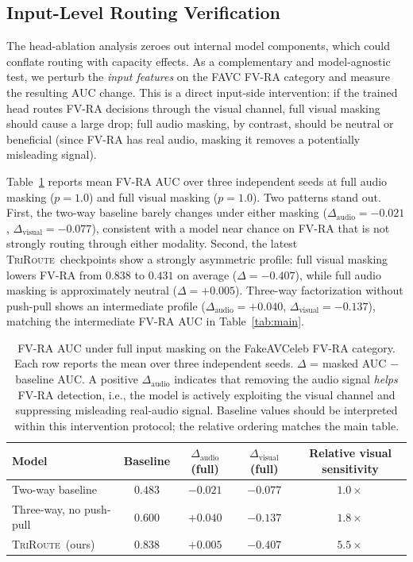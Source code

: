 \documentclass{article}
\newcommand{\method}{\textsc{TriRoute}}
\begin{document}
\subsection{Input-Level Routing Verification}

The head-ablation analysis zeroes out internal model components, which could conflate routing with capacity effects. As a complementary and model-agnostic test, we perturb the \emph{input features} on the FAVC FV-RA category and measure the resulting AUC change. This is a direct input-side intervention: if the trained head routes FV-RA decisions through the visual channel, full visual masking should cause a large drop; full audio masking, by contrast, should be neutral or beneficial (since FV-RA has real audio, masking it removes a potentially misleading signal).

Table~\ref{tab:perturbation} reports mean FV-RA AUC over three independent seeds at full audio masking ($p=1.0$) and full visual masking ($p=1.0$). Two patterns stand out. First, the two-way baseline barely changes under either masking ($\Delta_{\mathrm{audio}}=-0.021$, $\Delta_{\mathrm{visual}}=-0.077$), consistent with a model near chance on FV-RA that is not strongly routing through either modality. Second, the latest \method\ checkpoints show a strongly asymmetric profile: full visual masking lowers FV-RA from $0.838$ to $0.431$ on average ($\Delta=-0.407$), while full audio masking is approximately neutral ($\Delta=+0.005$). Three-way factorization without push-pull shows an intermediate profile ($\Delta_{\mathrm{audio}}=+0.040$, $\Delta_{\mathrm{visual}}=-0.137$), matching the intermediate FV-RA AUC in Table~\ref{tab:main}.

\begin{table}[t]
    \centering
    \caption{FV-RA AUC under full input masking on the FakeAVCeleb FV-RA category. Each row reports the mean over three independent seeds. $\Delta$ = masked AUC $-$ baseline AUC. A positive $\Delta_{\mathrm{audio}}$ indicates that removing the audio signal \emph{helps} FV-RA detection, i.e., the model is actively exploiting the visual channel and suppressing misleading real-audio signal. Baseline values should be interpreted within this intervention protocol; the relative ordering matches the main table.}
    \label{tab:perturbation}
    \small
    \begin{tabular}{lcccc}
        \toprule
        Model & Baseline & $\Delta_{\mathrm{audio}}$ (full) & $\Delta_{\mathrm{visual}}$ (full) & Relative visual sensitivity \\
        \midrule
        Two-way baseline        & $0.483$ & $-0.021$ & $-0.077$ & $1.0\times$ \\
        Three-way, no push-pull & $0.600$ & $+0.040$ & $-0.137$ & $1.8\times$ \\
        \method\ (ours) & $\mathbf{0.838}$ & $\mathbf{+0.005}$ & $\mathbf{-0.407}$ & $\mathbf{5.5\times}$ \\
        \bottomrule
    \end{tabular}
\end{table}
\end{document}
